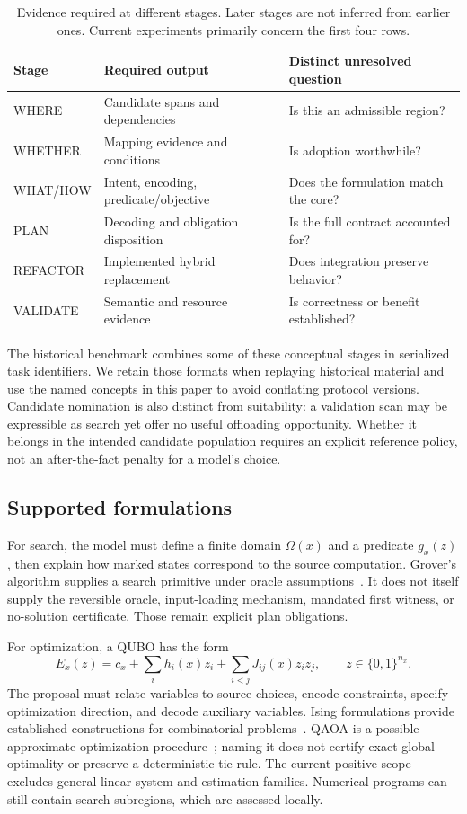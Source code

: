 \begin{table}[tb]
\caption{Evidence required at different stages. Later stages are not inferred
from earlier ones. Current experiments primarily concern the first four rows.}
\label{tab:stages}
\begin{tabularx}{\linewidth}{lYY}
\toprule
Stage & Required output & Distinct unresolved question \\
\midrule
WHERE & Candidate spans and dependencies & Is this an admissible region? \\
WHETHER & Mapping evidence and conditions & Is adoption worthwhile? \\
WHAT/HOW & Intent, encoding, predicate/objective & Does the formulation match the core? \\
PLAN & Decoding and obligation disposition & Is the full contract accounted for? \\
REFACTOR & Implemented hybrid replacement & Does integration preserve behavior? \\
VALIDATE & Semantic and resource evidence & Is correctness or benefit established? \\
\bottomrule
\end{tabularx}
\end{table}

The historical benchmark combines some of these conceptual stages in serialized
task identifiers. We retain those formats when replaying historical material and
use the named concepts in this paper to avoid conflating protocol versions.
Candidate nomination is also distinct from suitability: a validation scan may
be expressible as search yet offer no useful offloading opportunity. Whether it
belongs in the intended candidate population requires an explicit reference
policy, not an after-the-fact penalty for a model's choice.

\subsection{Supported formulations}
For search, the model must define a finite domain $\Omega(x)$ and a predicate
$g_x(z)$, then explain how marked states correspond to the source computation.
Grover's algorithm supplies a search primitive under oracle
assumptions~\cite{grover}. It does not itself supply the reversible oracle,
input-loading mechanism, mandated first witness, or no-solution certificate.
Those remain explicit plan obligations.

For optimization, a QUBO has the form
\begin{equation}
 E_x(z)=c_x+\sum_i h_i(x)z_i+\sum_{i<j}J_{ij}(x)z_i z_j,
 \qquad z\in\{0,1\}^{n_x}.
 \label{eq:qubo}
\end{equation}
The proposal must relate variables to source choices, encode constraints, specify
optimization direction, and decode auxiliary variables. Ising formulations
provide established constructions for combinatorial problems~\cite{lucas}.
QAOA is a possible approximate optimization procedure~\cite{qaoa}; naming it
does not certify exact global optimality or preserve a deterministic tie rule.
The current positive scope excludes general linear-system and estimation families.
Numerical programs can still contain search subregions, which are assessed locally.

